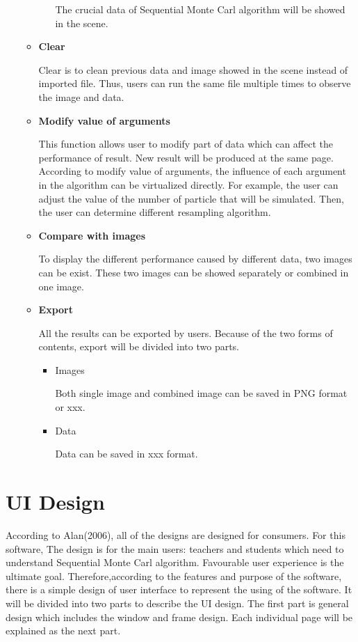 \documentclass[11pt,oneside,a4paper]{article}
\begin{document}
\begin{itemize}
\begin{itemize}
\begin{itemize}
            The crucial data of Sequential Monte Carl algorithm will be showed in the scene.%
          \end{itemize}
          \item \textbf{Clear}

          Clear is to clean previous data and image showed in the scene instead of imported file. Thus, users can run the same file multiple times to observe the image and data.
          \item \textbf{Modify value of arguments}

          This function allows user to modify part of data which can affect the performance of result. New result will be produced at the same page. According to modify value of arguments, the influence of each argument in the algorithm can be virtualized directly.
          For example, the user can adjust the value of the number of particle that will be simulated.
          Then, the user can determine different resampling algorithm.

          \item \textbf{Compare with images}

          To display the different performance caused by different data, two images can be exist. These two images can be showed separately or combined in one image.
          \item \textbf{Export}

          All the results can be exported by users. Because of the two forms of contents, export will be divided into two parts.
          \begin{itemize}
            \item Images

            Both single image and combined image can be saved in PNG format or xxx.
            \item Data

            Data can be saved in xxx format.
          \end{itemize}
       \end{itemize}
     \end{itemize}

\vspace{20}
\section{UI Design}
According to Alan(2006), all of the designs are designed for consumers. For this software, The design is for the main users: teachers and students which need to understand Sequential Monte Carl algorithm. Favourable user experience is the ultimate goal. Therefore,according to the features and purpose of the software, there is a simple design of user interface to represent the using of the software. It will be divided into two parts to describe the UI design. The first part is general design which includes the window and frame design. Each individual page will be explained as the next part.
\end{document}
